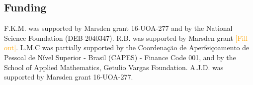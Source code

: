 \documentclass[oneside]{article}
\begin{document}
\subsection*{Funding}
F.K.M. was supported by Marsden grant 16-UOA-277 and by the National Science Foundation (DEB-2040347).
R.B. was supported by Marsden grant \textcolor{orange}{[Fill out]}.
L.M.C was partially supported by the Coordenação de Aperfeiçoamento de
Pessoal de Nível Superior - Brasil (CAPES) - Finance Code 001, and by the School of Applied Mathematics,  Getulio Vargas Foundation.
A.J.D. was supported by Marsden grant 16-UOA-277.






\end{document}
